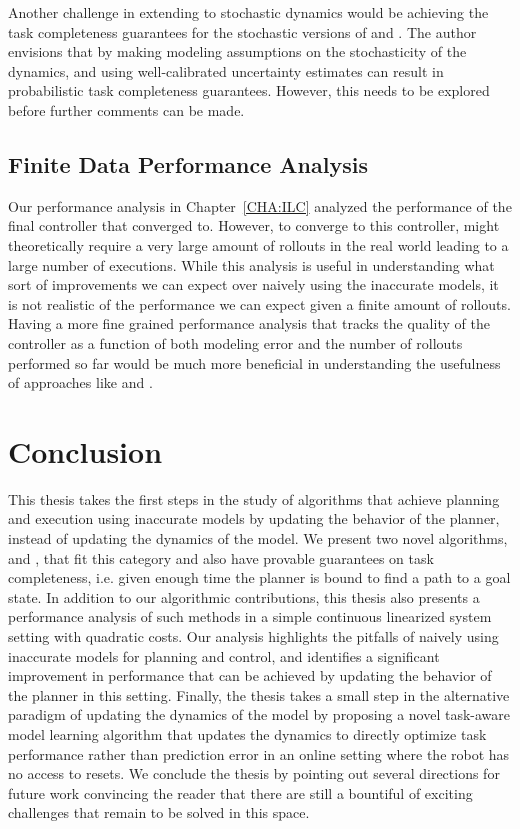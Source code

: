 Another challenge in extending to stochastic dynamics would be
achieving the task completeness guarantees for the stochastic versions
of \cmax{} and \cmaxpp{}. The author envisions that by making modeling
assumptions on the stochasticity of the dynamics, and using
well-calibrated uncertainty estimates can result in probabilistic task
completeness guarantees. However, this needs to be explored before
further comments can be made.

\subsection{Finite Data Performance Analysis}
\label{sec:finite-data-perf}

Our performance analysis in Chapter~\ref{CHA:ILC} analyzed the
performance of the final controller that \ILC{} converged to. However,
to converge to this controller, \ILC{} might theoretically require a
very large amount of rollouts in the real world leading to a large
number of executions. While this analysis is useful in understanding
what sort of improvements we can expect over naively using the
inaccurate models, it is not realistic of the performance we can
expect given a finite amount of rollouts. Having a more fine grained
performance analysis that tracks the quality of the controller as a
function of both modeling error and the number of rollouts performed
so far would be much more beneficial in understanding the usefulness
of approaches like \cmax{} and \cmaxpp{}.

\section{Conclusion}
\label{sec:conclusion-1}

This thesis takes the first steps in the study of algorithms that
achieve planning and execution using inaccurate models by updating the
behavior of the planner, instead of updating the dynamics of the
model. We present two novel algorithms, \cmax{} and \cmaxpp{}, that
fit this category and also have provable guarantees on task
completeness, i.e. given enough time the planner is bound to find a
path to a goal state. In addition to our algorithmic contributions,
this thesis also presents a performance analysis of such methods in a
simple continuous linearized system setting with quadratic costs. Our
analysis highlights the pitfalls of naively using inaccurate models
for planning and control, and identifies a significant improvement in
performance that can be achieved by updating the behavior of the
planner in this setting. Finally, the thesis takes a small step in the
alternative paradigm of updating the dynamics of the model by
proposing a novel task-aware model learning algorithm \taml{} that
updates the dynamics to 
directly optimize task performance rather than prediction error in an
online setting where the robot has no access to resets. We conclude
the thesis by pointing out several directions for future work
convincing the reader that there are still a bountiful of exciting
challenges that remain to be solved in this space.

